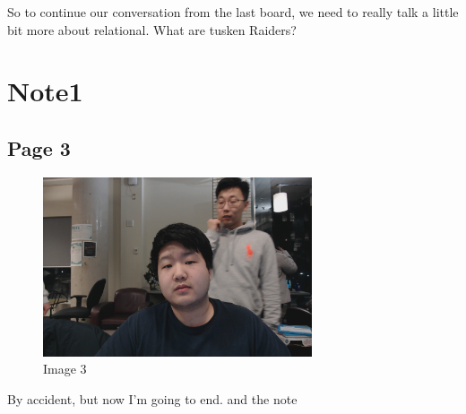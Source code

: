 \documentclass{article}%
\begin{document}
%
So to continue our conversation from the last board, we need to really talk a little bit more about relational. What are tusken Raiders? \newline%

%
\section{Note1}%
\label{sec:Note1}%
\subsection{Page 3}%
\label{subsec:Page 3}%


\begin{figure}[h!]%
\centering%
\includegraphics[width=300px]{../Notes/IntroductiontoDatabases/Note1/image3.jpg}%
\caption{Image 3}%
\end{figure}

%
By accident, but now I'm going to end. \newline%
 and the note \newline%

%
\end{document}
